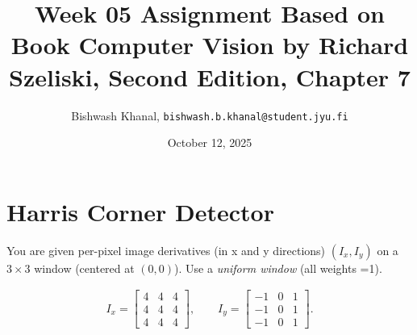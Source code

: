 \documentclass[12pt,a4paper]{article}
\title{Week 05 Assignment Based on Book Computer Vision by Richard Szeliski, Second Edition, Chapter 7}
\author{Bishwash Khanal, \texttt{bishwash.b.khanal@student.jyu.fi}}
\date{October 12, 2025}
\begin{document}
\maketitle

\section{Harris Corner Detector}
You are given per-pixel image derivatives (in x and y directions) $(I_x,I_y)$ on a $3\times 3$ window (centered at $(0,0)$). Use a \textit{uniform window} (all weights =1).

\begin{align*}
I_x=\begin{bmatrix}
4&4&4\\
4&4&4\\
4&4&4
\end{bmatrix},\qquad
I_y=\begin{bmatrix}
-1&0&1\\
-1&0&1\\
-1&0&1
\end{bmatrix}.
\end{align*}
\end{document}
